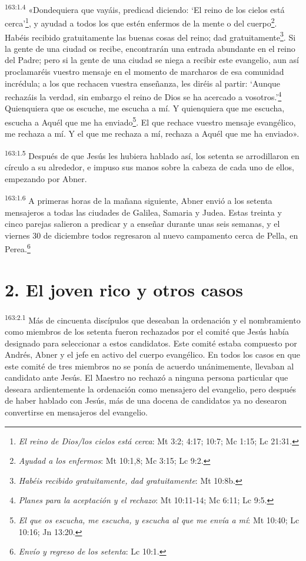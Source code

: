 \par 
\textsuperscript{163:1.4} «Dondequiera que vayáis, predicad diciendo: `El reino de los cielos está cerca'\footnote{\textit{El reino de Dios/los cielos está cerca}: Mt 3:2; 4:17; 10:7; Mc 1:15; Lc 21:31.}, y ayudad a todos los que estén enfermos de la mente o del cuerpo\footnote{\textit{Ayudad a los enfermos}: Mt 10:1,8; Mc 3:15; Lc 9:2.}. Habéis recibido gratuitamente las buenas cosas del reino; dad gratuitamente\footnote{\textit{Habéis recibido gratuitamente, dad gratuitamente}: Mt 10:8b.}. Si la gente de una ciudad os recibe, encontrarán una entrada abundante en el reino del Padre; pero si la gente de una ciudad se niega a recibir este evangelio, aun así proclamaréis vuestro mensaje en el momento de marcharos de esa comunidad incrédula; a los que rechacen vuestra enseñanza, les diréis al partir: `Aunque rechazáis la verdad, sin embargo el reino de Dios se ha acercado a vosotros.'\footnote{\textit{Planes para la aceptación y el rechazo}: Mt 10:11-14; Mc 6:11; Lc 9:5.} Quienquiera que os escuche, me escucha a mí. Y quienquiera que me escucha, escucha a Aquél que me ha enviado\footnote{\textit{El que os escucha, me escucha, y escucha al que me envía a mí}: Mt 10:40; Lc 10:16; Jn 13:20.}. El que rechace vuestro mensaje evangélico, me rechaza a mí. Y el que me rechaza a mí, rechaza a Aquél que me ha enviado».

\par 
\textsuperscript{163:1.5} Después de que Jesús les hubiera hablado así, los setenta se arrodillaron en círculo a su alrededor, e impuso sus manos sobre la cabeza de cada uno de ellos, empezando por Abner.

\par 
\textsuperscript{163:1.6} A primeras horas de la mañana siguiente, Abner envió a los setenta mensajeros a todas las ciudades de Galilea, Samaria y Judea. Estas treinta y cinco parejas salieron a predicar y a enseñar durante unas seis semanas, y el viernes 30 de diciembre todos regresaron al nuevo campamento cerca de Pella, en Perea.\footnote{\textit{Envío y regreso de los setenta}: Lc 10:1.}

\section*{2. El joven rico y otros casos}
\par 
\textsuperscript{163:2.1} Más de cincuenta discípulos que deseaban la ordenación y el nombramiento como miembros de los setenta fueron rechazados por el comité que Jesús había designado para seleccionar a estos candidatos. Este comité estaba compuesto por Andrés, Abner y el jefe en activo del cuerpo evangélico. En todos los casos en que este comité de tres miembros no se ponía de acuerdo unánimemente, llevaban al candidato ante Jesús. El Maestro no rechazó a ninguna persona particular que deseara ardientemente la ordenación como mensajero del evangelio, pero después de haber hablado con Jesús, más de una docena de candidatos ya no desearon convertirse en mensajeros del evangelio.

